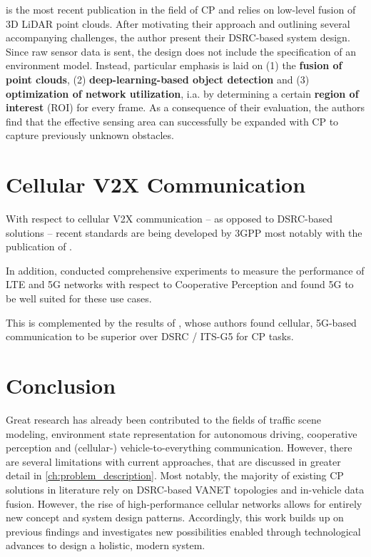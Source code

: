 \cite{Chen2019} is the most recent publication in the field of CP and relies on low-level fusion of 3D LiDAR point clouds. After motivating their approach and outlining several accompanying challenges, the author present their DSRC-based system design. Since raw sensor data is sent, the design does not include the specification of an environment model. Instead, particular emphasis is laid on (1) the \textbf{fusion of point clouds}, (2)\textbf{ deep-learning-based object detection} and (3) \textbf{optimization of network utilization}, i.a. by determining a certain \textbf{region of interest} (ROI) for every frame. As a consequence of their evaluation, the authors find that the effective sensing area can successfully be expanded with CP to capture previously unknown obstacles. 

\section{Cellular V2X Communication}
\label{sec:related_work:cellular_v2x_communication}
With respect to cellular V2X communication – as opposed to DSRC-based solutions – recent standards are being developed by 3GPP most notably with the publication of \cite{3GPP2019}.

In addition, \cite{QualcommTechnologiesInc.2018} conducted comprehensive experiments to measure the performance of LTE and 5G networks with respect to Cooperative Perception and found 5G to be well suited for these use cases. 

This is complemented by the results of \cite{5GAutomotiveAssociation2016}, whose authors found cellular, 5G-based communication to be superior over DSRC / ITS-G5 for CP tasks.

\section{Conclusion}
\label{sec:related_work:conclusion}
Great research has already been contributed to the fields of traffic scene modeling, environment state representation for autonomous driving, cooperative perception and (cellular-) vehicle-to-everything communication. However, there are several limitations with current approaches, that are discussed in greater detail in \autoref{ch:problem_description}. Most notably, the majority of existing CP solutions in literature rely on DSRC-based VANET topologies and in-vehicle data fusion. However, the rise of high-performance cellular networks allows for entirely new concept and system design patterns. Accordingly, this work builds up on previous findings and investigates new possibilities enabled through technological advances to design a holistic, modern system. 